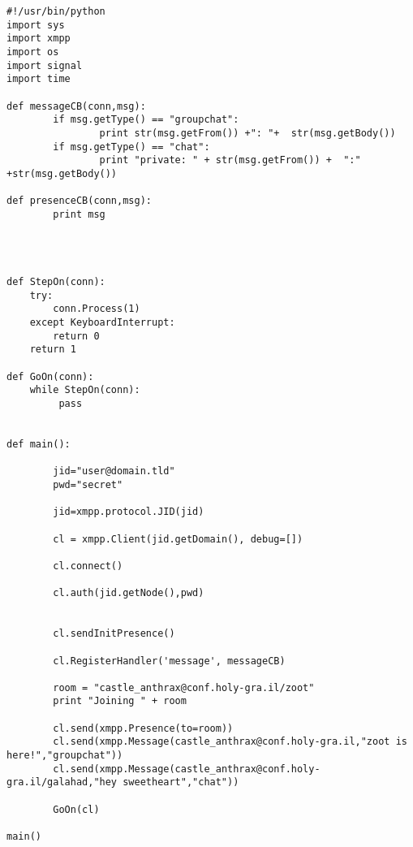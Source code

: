 \begin{verbatim}
#!/usr/bin/python
import sys
import xmpp
import os
import signal
import time

def messageCB(conn,msg):
        if msg.getType() == "groupchat":
                print str(msg.getFrom()) +": "+  str(msg.getBody())
        if msg.getType() == "chat":
                print "private: " + str(msg.getFrom()) +  ":" +str(msg.getBody())

def presenceCB(conn,msg):
        print msg




def StepOn(conn):
    try:
        conn.Process(1)
    except KeyboardInterrupt:
        return 0
    return 1

def GoOn(conn):
    while StepOn(conn):
         pass


def main():

        jid="user@domain.tld"
        pwd="secret"

        jid=xmpp.protocol.JID(jid)

        cl = xmpp.Client(jid.getDomain(), debug=[])

        cl.connect()

        cl.auth(jid.getNode(),pwd)


        cl.sendInitPresence()

        cl.RegisterHandler('message', messageCB)

        room = "castle_anthrax@conf.holy-gra.il/zoot"
        print "Joining " + room

        cl.send(xmpp.Presence(to=room))
        cl.send(xmpp.Message(castle_anthrax@conf.holy-gra.il,"zoot is here!","groupchat"))
        cl.send(xmpp.Message(castle_anthrax@conf.holy-gra.il/galahad,"hey sweetheart","chat"))

        GoOn(cl)

main()
\end{verbatim}